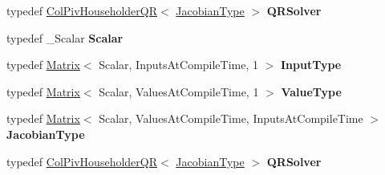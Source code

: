 \begin{DoxyCompactItemize}
\item 
\mbox{\label{struct_eigen_1_1_dense_functor_aeb3ddc0697bfd92d6687bf37c6224f12}} 
typedef \hyperlink{group___q_r___module_class_eigen_1_1_col_piv_householder_q_r}{Col\+Piv\+Householder\+QR}$<$ \hyperlink{group___core___module_class_eigen_1_1_matrix}{Jacobian\+Type} $>$ {\bfseries Q\+R\+Solver}
\item 
\mbox{\label{struct_eigen_1_1_dense_functor_a8a443f2cd4c4b4d87efd8d2e5e6a7f13}} 
typedef \+\_\+\+Scalar {\bfseries Scalar}
\item 
\mbox{\label{struct_eigen_1_1_dense_functor_a46f643404e97345f6b7b65aaa611bcd1}} 
typedef \hyperlink{group___core___module_class_eigen_1_1_matrix}{Matrix}$<$ Scalar, Inputs\+At\+Compile\+Time, 1 $>$ {\bfseries Input\+Type}
\item 
\mbox{\label{struct_eigen_1_1_dense_functor_a9ea73a4caee5265cbae45c2692900383}} 
typedef \hyperlink{group___core___module_class_eigen_1_1_matrix}{Matrix}$<$ Scalar, Values\+At\+Compile\+Time, 1 $>$ {\bfseries Value\+Type}
\item 
\mbox{\label{struct_eigen_1_1_dense_functor_a01a6ac8a8bf00b999a06b0f898edc3b7}} 
typedef \hyperlink{group___core___module_class_eigen_1_1_matrix}{Matrix}$<$ Scalar, Values\+At\+Compile\+Time, Inputs\+At\+Compile\+Time $>$ {\bfseries Jacobian\+Type}
\item 
\mbox{\label{struct_eigen_1_1_dense_functor_aeb3ddc0697bfd92d6687bf37c6224f12}} 
typedef \hyperlink{group___q_r___module_class_eigen_1_1_col_piv_householder_q_r}{Col\+Piv\+Householder\+QR}$<$ \hyperlink{group___core___module_class_eigen_1_1_matrix}{Jacobian\+Type} $>$ {\bfseries Q\+R\+Solver}
\end{DoxyCompactItemize}
